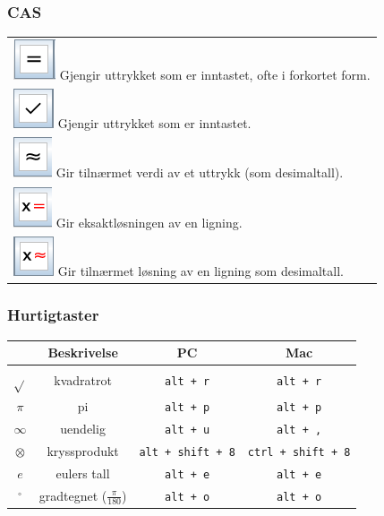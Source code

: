 \subsubsection*{CAS}
\begin{tabular}{@{}l}
	\;\includegraphics[scale=0.4]{fig/erlik} Gjengir uttrykket som er inntastet, ofte i forkortet form.\\	
	\;\includegraphics[scale=0.4]{fig/brin} Gjengir uttrykket som er inntastet.\\	
	\;\includegraphics[scale=0.4]{fig/caerlik} Gir tilnærmet verdi av et uttrykk (som desimaltall). \\	
	\;\includegraphics[scale=0.4]{fig/x} Gir eksaktløsningen av en ligning.\\
	\;\includegraphics[scale=0.4]{fig/xca} Gir tilnærmet løsning av en ligning som desimaltall.\\
	
\end{tabular}

\subsubsection{Hurtigtaster}
\begin{tabular}{@{}c | c |c | c }
	&\textbf{Beskrivelse} & \textbf{PC }& \textbf{Mac} \\ \hline
	$ \sqrt{} $	& kvadratrot& \texttt{alt\,+\,r} &\texttt{alt\,+\,r} \\\hline
	$ \pi $	& pi& \texttt{alt\,+\,p} & \texttt{alt\,+\,p}\\\hline
	$ \infty $ &uendelig& \texttt{alt\,+\,u} &\texttt{alt\,+\,,}  \\\hline
	$ \otimes $&kryssprodukt & \texttt{alt\,+\,shift\,+\,8}&\texttt{ctrl\,+\,shift\,+\,8} \\\hline
	$ e $&eulers tall & \texttt{alt\,+\,e}& \texttt{alt\,+\,e}\\\hline
	$ {}^\circ $&gradtegnet ($ \frac{\pi}{180} $) & \texttt{alt\,+\,o}& \texttt{alt\,+\,o}
	\\\hline	
\end{tabular}
\newpage

